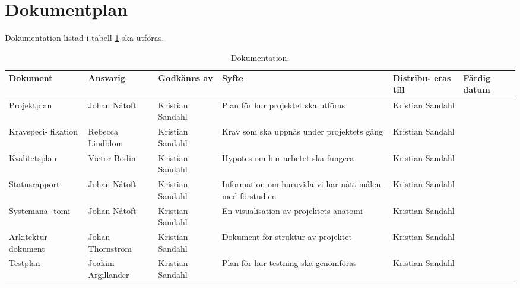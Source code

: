 \section{Dokumentplan}
Dokumentation listad i tabell \ref{tab:dokumentation} ska utföras.

\begin{table}[h]
\centering
\caption{Dokumentation.}
\def\arraystretch{1.5}%
\begin{tabularx}{\textwidth}{| p{20mm} | X | X | X | X | X |}
	\hline
	\textbf{Dokument} & \textbf{Ansvarig} & \textbf{Godkänns av} & \textbf{Syfte} & \textbf{Distribu- eras till} & \textbf{Färdig datum} \\\hline
	{Projektplan} & {Johan Nåtoft} & {Kristian Sandahl} & {Plan för hur projektet ska utföras} & {Kristian Sandahl} & {} \\\hline
	{Kravspeci- fikation} & {Rebecca Lindblom} & {Kristian Sandahl} & {Krav som ska uppnås under projektets gång} & {Kristian Sandahl} & {} \\\hline
	{Kvalitetsplan} & {Victor Bodin} & {Kristian Sandahl} & {Hypotes om hur arbetet ska fungera} & {Kristian Sandahl} & {} \\\hline
	{Statusrapport} & {Johan Nåtoft} & {Kristian Sandahl} & {Information om huruvida vi har nått målen med förstudien} & {Kristian Sandahl} & {} \\\hline
	{Systemana- tomi} & {Johan Nåtoft} & {Kristian Sandahl} & {En visualisation av projektets anatomi} & {Kristian Sandahl} & {} \\\hline
	{Arkitektur- dokument} & {Johan Thornström} & {Kristian Sandahl} & {Dokument för struktur av projektet} & {Kristian Sandahl} & {} \\\hline
	{Testplan} & {Joakim Argillander} & {Kristian Sandahl} & {Plan för hur testning ska genomföras} & {Kristian Sandahl} & {} \\\hline
	
\end{tabularx}
\label{tab:dokumentation}
\end{table}
\newpage
